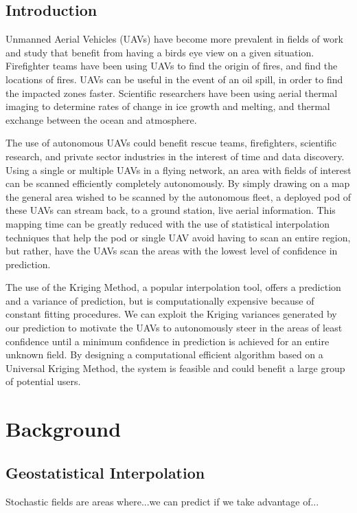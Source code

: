 \documentclass[11pt]{ucthesis}
\begin{document}
\chapter{Introduction}
Unmanned Aerial Vehicles (UAVs) have become more prevalent in fields of work and study that benefit from having a birds eye view on a given situation. Firefighter teams have been using UAVs to find the origin of fires, and find the locations of fires. UAVs can be useful in the event of an oil spill, in order to find the impacted zones faster. Scientific researchers have been using aerial thermal imaging to determine rates of change in ice growth and melting, and thermal exchange between the ocean and atmosphere.
\par
The use of autonomous UAVs could benefit rescue teams, firefighters, scientific research, and private sector industries in the interest of time and data discovery. Using a single or multiple UAVs in a flying network, an area with fields of interest can be scanned efficiently completely autonomously. By simply drawing on a map the general area wished to be scanned by the autonomous fleet, a deployed pod of these UAVs can stream back, to a ground station, live aerial information. This mapping time can be greatly reduced with the use of statistical interpolation techniques that help the pod or single UAV avoid having to scan an entire region, but rather, have the UAVs scan the areas with the lowest level of confidence in prediction.
\par
The use of the Kriging Method, a popular interpolation tool, offers a prediction and a variance of prediction, but is computationally expensive because of constant fitting procedures. We can exploit the Kriging variances generated by our prediction to motivate the UAVs to autonomously steer in the areas of least confidence until a minimum confidence in prediction is achieved for an entire unknown field. By designing a computational efficient algorithm based on a Universal Kriging Method, the system is feasible and could benefit a large group of potential users.

\part{Background}
\chapter{Geostatistical Interpolation}
Stochastic fields are areas where...we can predict if we take advantage of...
\end{document}
